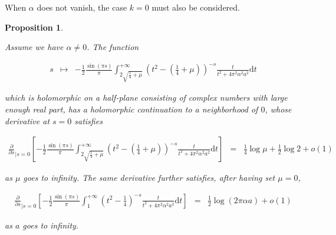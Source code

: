 \documentclass{jams-l}
\newtheorem{proposition}[theorem]{Proposition}
\theoremstyle{definition}
\theoremstyle{remark}
\numberwithin{equation}{section}
\begin{document}
                When $\alpha$ does not vanish, the case $k = 0$ must also be considered.
                
                \begin{proposition}
                \label{PropMTilde3-0}
                
                    Assume we have $\alpha \neq 0$. The function
                    
                    \[ \begin{array}{lll}
                            s & \longmapsto & - \frac{1}{2} \frac{\sin \left( \pi s \right)}{\pi} \int_{2 \sqrt{\frac{1}{4} + \mu}}^{+ \infty} \left( t^2 - \left( \frac{1}{4} + \mu \right) \right)^{-s} \frac{t}{t^2 + 4 \pi^2 \alpha^2 a^2} \mathrm{d}t
                        \end{array} \]
                    
                    \noindent which is holomorphic on a half-plane consisting of complex numbers with large enough real part, has a holomorphic continuation to a neighborhood of $0$, whose derivative at $s=0$ satisfies
                    
                    \[ \begin{array}{lll}
                            \scriptstyle \frac{\partial}{\partial s}_{\left \vert s = 0 \right.} \left[ - \frac{1}{2} \frac{\sin \left( \pi s \right)}{\pi} \int_{2 \sqrt{\frac{1}{4} + \mu}}^{+ \infty} \left( t^2 - \left( \frac{1}{4} + \mu \right) \right)^{-s} \frac{t}{t^2 + 4 \pi^2 \alpha^2 a^2} \mathrm{d}t \right]& \scriptstyle = & \scriptstyle \frac{1}{4} \log \mu + \frac{1}{2} \log 2 + o \left( 1 \right)
                        \end{array} \]
                    
                    \noindent as $\mu$ goes to infinity. The same derivative further satisfies, after having set $\mu = 0$,
                    
                    \[ \begin{array}{lll}
                            \scriptstyle \frac{\partial}{\partial s}_{\left \vert s = 0 \right.} \left[ - \frac{1}{2} \frac{\sin \left( \pi s \right)}{\pi} \int_1^{+ \infty} \left( t^2 - \frac{1}{4} \right)^{-s} \frac{t}{t^2 + 4 \pi^2 \alpha^2 a^2} \mathrm{d}t \right] & \scriptstyle = & \scriptstyle \frac{1}{2} \log \left( 2 \pi \alpha a \right) + o \left( 1 \right)
                        \end{array} \]
                    
                    \noindent as $a$ goes to infinity.
                
                \end{proposition}
                
\end{document}
